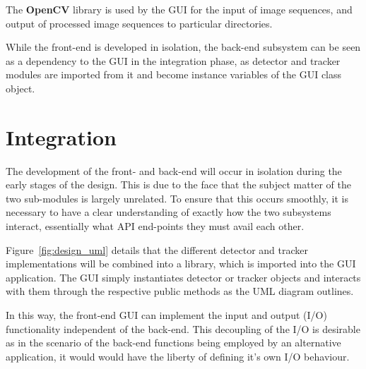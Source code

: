 The \textbf{OpenCV} library is used by the GUI for the input of image sequences,
and output of processed image sequences to particular directories.

While the front-end is developed in isolation, the back-end subsystem can be
seen as a dependency to the GUI in the integration phase, as detector and
tracker modules are imported from it and become instance variables of the GUI
class object.

\section{Integration}
The development of the front- and back-end will occur in isolation during the
early stages of the design. This is due to the face that the subject matter of
the two sub-modules is largely unrelated. To ensure that this occurs smoothly,
it is necessary to have a clear understanding of exactly how the two subsystems
interact, essentially what API end-points they must avail each other.

Figure~\ref{fig:design_uml} details that the different detector and tracker
implementations will be combined into a library, which is imported into the GUI
application.
The GUI simply instantiates detector or tracker objects and interacts with them
through the respective public methods as the UML diagram outlines.

In this way, the front-end GUI can implement the input and output (I/O) functionality
independent of the back-end. This decoupling of the I/O is desirable as in the
scenario of the back-end functions being employed by an alternative application,
it would would have the liberty of defining it's own I/O behaviour. 


